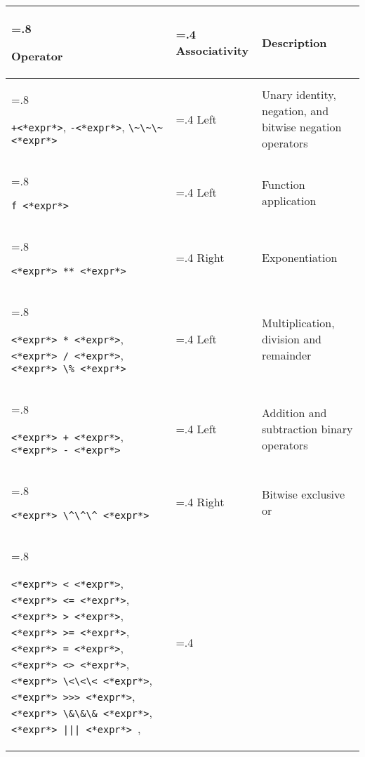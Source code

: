 \begin{table}
  \centering
  \begin{tabularx}{\linewidth}{|>{\hsize=.8\hsize\raggedright\arraybackslash}X|>{\hsize=.4\hsize}X|>{\hsize=1.8\hsize}X|}
    \hline
    \rowcolor{headerRowColor}     Operator & Associativity & Description\\
    \hline
    \mbox{\lstinline[language=syntax]|+<*expr*>|\hspace*{3.5mm},} \mbox{\lstinline[language=syntax]|-<*expr*>|\hspace*{3.5mm},} \mbox{\lstinline[language=syntax]|\~\~\~<*expr*>|\hspace*{3.5mm}} & Left & Unary identity, negation, and bitwise negation operators\\
    \hline
    \mbox{\lstinline[language=syntax]|f <*expr*>|\hspace*{3.5mm}} & Left & Function application\\
    \hline
    \mbox{\lstinline[language=syntax]|<*expr*> ** <*expr*>|\hspace*{3.5mm}} & Right & Exponentiation\\ 
    \hline
    \mbox{\lstinline[language=syntax]|<*expr*> * <*expr*>|\hspace*{7mm},} \mbox{\lstinline[language=syntax]|<*expr*> / <*expr*>|\hspace*{7mm},} \mbox{\lstinline[language=syntax]|<*expr*> \% <*expr*>|\hspace*{7mm}} & Left & Multiplication, division and remainder\\
    \hline
    \mbox{\lstinline[language=syntax]|<*expr*> + <*expr*>|\hspace*{7mm},} \mbox{\lstinline[language=syntax]|<*expr*> - <*expr*>|\hspace*{7mm}} & Left & Addition and subtraction binary operators\\
    \hline
    \mbox{\lstinline[language=syntax]|<*expr*> \^\^\^ <*expr*>|\hspace*{7mm}} & Right & Bitwise exclusive or\\
    \hline
    \mbox{\lstinline[language=syntax]|<*expr*> < <*expr*>|\hspace*{7mm},} \mbox{\lstinline[language=syntax]|<*expr*> <= <*expr*>|\hspace*{7mm},} \mbox{\lstinline[language=syntax]|<*expr*> > <*expr*>|\hspace*{7mm},} \mbox{\lstinline[language=syntax]|<*expr*> >= <*expr*>|\hspace*{7mm},} \mbox{\lstinline[language=syntax]|<*expr*> = <*expr*>|\hspace*{7mm},} \mbox{\lstinline[language=syntax]|<*expr*> <> <*expr*>|\hspace*{7mm},} \mbox{\lstinline[language=syntax]|<*expr*> \<\<\< <*expr*>|\hspace*{7mm},} \mbox{\lstinline[language=syntax]|<*expr*> >>> <*expr*>|\hspace*{7mm},} \mbox{\lstinline[language=syntax]|<*expr*> \&\&\& <*expr*>|\hspace*{7mm},} \mbox{\lstinline[language=syntax]!<*expr*> ||| <*expr*>! \hspace*{7mm},}

\end{tabularx}
\end{table}
